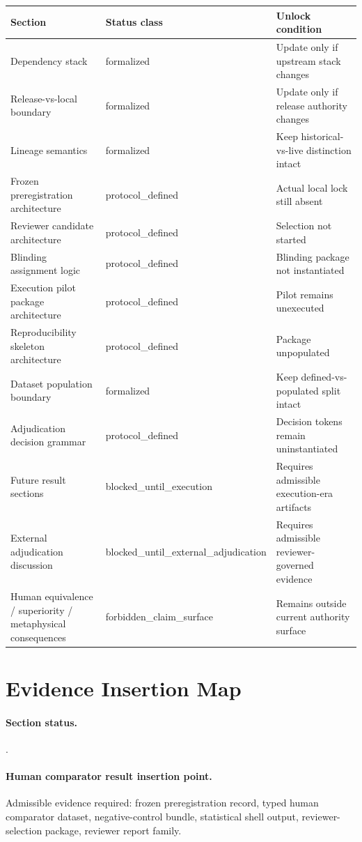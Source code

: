 \documentclass[11pt]{article}
\newcommand{\sectionstatus}[1]{\paragraph{Section status.}\texttt{\detokenize{#1}}.}
\begin{document}
\begin{table}[h]
\centering
\small
\begin{tabular}{L{0.34\textwidth}L{0.20\textwidth}L{0.34\textwidth}}
\toprule
Section & Status class & Unlock condition \\
\midrule
Dependency stack & formalized & Update only if upstream stack changes \\
Release-vs-local boundary & formalized & Update only if release authority changes \\
Lineage semantics & formalized & Keep historical-vs-live distinction intact \\
Frozen preregistration architecture & protocol\_defined & Actual local lock still absent \\
Reviewer candidate architecture & protocol\_defined & Selection not started \\
Blinding assignment logic & protocol\_defined & Blinding package not instantiated \\
Execution pilot package architecture & protocol\_defined & Pilot remains unexecuted \\
Reproducibility skeleton architecture & protocol\_defined & Package unpopulated \\
Dataset population boundary & formalized & Keep defined-vs-populated split intact \\
Adjudication decision grammar & protocol\_defined & Decision tokens remain uninstantiated \\
Future result sections & blocked\_until\_execution & Requires admissible execution-era artifacts \\
External adjudication discussion & blocked\_until\_external\_adjudication & Requires admissible reviewer-governed evidence \\
Human equivalence / superiority / metaphysical consequences & forbidden\_claim\_surface & Remains outside current authority surface \\
\bottomrule
\end{tabular}
\end{table}

\section{Evidence Insertion Map}
\sectionstatus{evidence_pending}

\paragraph{Human comparator result insertion point.}
Admissible evidence required: frozen preregistration record, typed human
comparator dataset, negative-control bundle, statistical shell output,
reviewer-selection package, reviewer report family.
\end{document}
